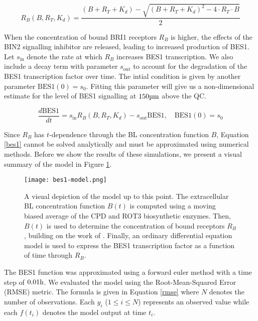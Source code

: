 \begin{equation}
\label{rb}
R_{B}(B, R_{T}, K_{d}) = \frac{(B + R_{T} + K_{d}) - \sqrt{(B + R_{T} + K_{d})^{2} - 4 \cdot R_{T} \cdot B}}{2}
\end{equation}


When the concentration of bound BRI1 receptors $R_{B}$ is higher, the effects of the BIN2 signalling inhibitor are released, leading to increased production of BES1. Let $s_{\text{in}}$ denote the rate at which $R_{B}$ increases BES1 transcription. We also include a decay term with parameter $s_{\text{out}}$ to account for the degradation of the BES1 transcription factor over time. The intial condition is given by another parameter $\text{BES1}(0) = s_{0}$. Fitting this parameter will give us a non-dimensional estimate for the level of BES1 signalling at $150\um$ above the QC. 

\begin{equation}
\label{bes1}
\frac{d\text{BES1}}{dt} = s_{\text{in}}R_{B}(B, R_{T}, K_{d}) - s_{\text{out}}\text{BES1},\quad \text{BES1}(0) = s_{0}
\end{equation}

Since $R_{B}$ has $t$-dependence through the BL concentration function $B$, Equation \eqref{bes1} cannot be solved analytically and must be approximated using numerical methods. Before we show the results of these simulations, we present a visual summary of the model in Figure \ref{fig:bes1-model}.

\begin{figure}
    \centering
    \texttt{[image: bes1-model.png]}
    \caption{A visual depiction of the model up to this point. The extracellular BL concentration function $B(t)$ is computed using a moving biased average of the CPD and ROT3 biosynthetic enzymes. Then, $B(t)$ is used to determine the concentration of bound receptors $R_{B}$, building on the work of \cite{vanesse2012}. Finally, an ordinary differential equation model is used to express the BES1 transcription factor as a function of time through $R_{B}$.}
    \label{fig:bes1-model}
\end{figure}

\medskip

The BES1 function was approximated using a forward euler method with a time step of $0.01\h$. We evaluated the model using the Root-Mean-Squared Error (RMSE) metric. The formula is given in Equation \eqref{rmse} where $N$ denotes the number of observations. Each $y_{i}$ ($1 \leq i \leq N$) represents an observed value while each $f(t_{i})$ denotes the model output at time $t_{i}$.

